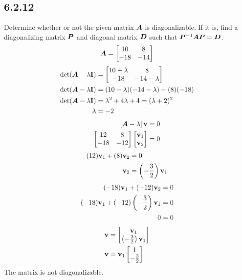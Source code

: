 \documentclass{article}
\begin{document}
\subsection{6.2.12}

Determine whether or not the given matrix $ \bm{A} $ is diagonalizable. If it is, find a diagonalizing matrix $ \bm{P} $ and diagonal matrix $ \bm{D} $ such that $ \bm{P}^{-1}\bm{A}\bm{P} = \bm{D} $.
\begin{equation*}
	\bm{A} =
		\begin{bmatrix}
			10 & 8 \\
			-18 & -14
		\end{bmatrix}
\end{equation*}
\begin{align*}
	\det( \matr{A} - \lambda \vect{I} ) & =
		\begin{bmatrix}
			10 - \lambda & 8 \\
			-18 & -14 - \lambda
		\end{bmatrix} \\
	\det( \matr{A} - \lambda \vect{I} ) & = (10 - \lambda)(-14 - \lambda) - (8)(-18) \\
	\det( \matr{A} - \lambda \vect{I} ) & = \lambda^2 + 4\lambda + 4 = (\lambda + 2)^2 \\
	\lambda & = -2
\end{align*}
\begin{align*}
	\left[ \matr{A} - \lambda \right] \vect{v} & = 0 \\
	\begin{bmatrix}
		12 & 8 \\
		-18 & -12
	\end{bmatrix}
	\begin{bmatrix} \vect{v}_1 \\ \vect{v}_2 \end{bmatrix} & = 0
\end{align*}
\begin{align*}
	(12)\vect{v}_1 + (8)\vect{v}_2 & = 0 \\
	\vect{v}_2 & = \left( -\frac{3}{2} \right) \vect{v}_1
\end{align*}
\begin{align*}
	(-18)\vect{v}_1 + (-12)\vect{v}_2 & = 0 \\
	(-18)\vect{v}_1 + (-12) \left( -\frac{3}{2} \right) \vect{v}_1 & = 0 \\
	0 & = 0
\end{align*}
\begin{align*}
	\vect{v} & = \begin{bmatrix} \vect{v}_1 \\ \left( -\frac{3}{2} \right) \vect{v}_1 \end{bmatrix} \\
	\vect{v} & = \vect{v}_1 \begin{bmatrix} 1 \\ -\frac{3}{2} \end{bmatrix}
\end{align*}
The matrix is not diagonalizable.
\end{document}
